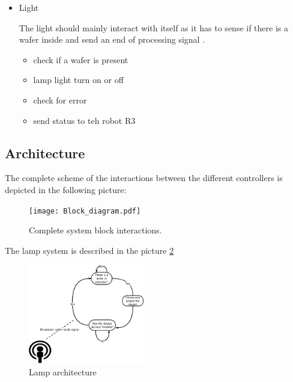 \documentclass[twocolumn]{article}
\begin{document}
\begin{itemize}
 
\item Light 

The light should mainly interact with itself as it has to sense if there is a wafer inside and send an end of processing signal .

\begin{itemize}
 \item check if  a wafer is  present
\item lamp light turn on or off
\item check for error
\item send status  to teh robot R3 
\end{itemize}

\end{itemize}
\subsection{Architecture}

The complete scheme of the interactions between the different controllers is depicted in the following picture:
\begin{figure}[t]
    \centering
    \texttt{[image: Block\_diagram.pdf]}
    \caption{Complete system block interactions.}
    \label{fig:complete}
\end{figure}

The lamp system is described in the picture \ref{fig:Lamp_architecture}
\begin{figure}[t]
    \centering
    \includegraphics[width=0.45\textwidth]{lamp.pdf}
    \caption{Lamp architecture}
    \label{fig:Lamp_architecture}
\end{figure}
\end{document}
